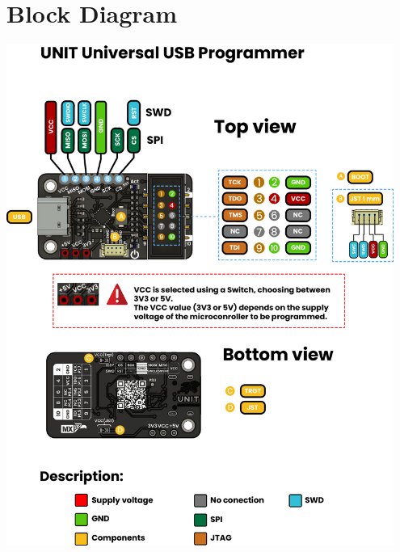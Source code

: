 \documentclass[10pt]{article}
\begin{document}
\FloatBarrier
\newpage
\vspace*{3em}
\section*{Block Diagram}
\vspace{1em}
\begin{center}
\includegraphics[width=0.95\textwidth,keepaspectratio]{images/function-diagram.jpg}
\end{center}
\newpage
\vspace*{3em}
\end{document}
